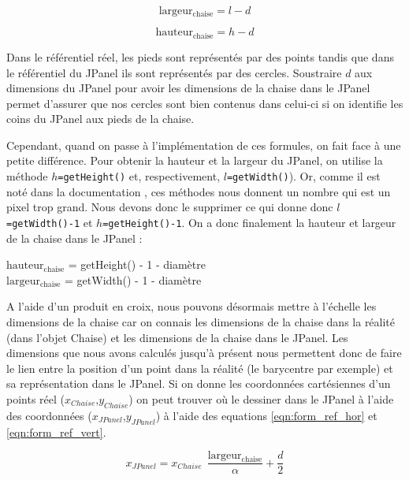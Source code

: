 \documentclass{polytech/polytech}
\begin{document}
\begin{equation}
\mathrm{largeur_{chaise}} = l - d
\end{equation}

\begin{equation}
\mathrm{hauteur_{chaise}} = h - d
\end{equation}

Dans le référentiel réel, les pieds sont représentés par des points tandis que dans le référentiel du JPanel ils sont représentés par des cercles. 
Soustraire $d$ aux dimensions du JPanel pour avoir les dimensions de la chaise dans le JPanel permet d'assurer que nos cercles sont bien contenus dans celui-ci si on identifie les coins du JPanel aux pieds de la chaise.

Cependant, quand on passe à l'implémentation de ces formules, on fait face à une petite différence. 
Pour obtenir la hauteur et la largeur du JPanel, on utilise la méthode \texttt{$h$=getHeight()} et, respectivement, \texttt{$l$=getWidth()}).
Or, comme il est noté dans la documentation \cite{ntu_swing}, ces méthodes nous donnent un nombre qui est un pixel trop grand. 
Nous devons donc le supprimer ce qui donne donc \texttt{$l$=getWidth()-1} et \texttt{$h$=getHeight()-1}.
On a donc finalement la hauteur et largeur de la chaise dans le JPanel :

\begin{center}
$\mathrm{hauteur_{chaise}}$  = getHeight() - 1 - diamètre\\
$\mathrm{largeur_{chaise}}$ = getWidth() - 1 - diamètre
\end{center}

A l'aide d'un produit en croix, nous pouvons désormais mettre à l'échelle les dimensions de la chaise car on connais les dimensions de la chaise dans la réalité (dans l'objet Chaise) et les dimensions de la chaise dans le JPanel.
Les dimensions que nous avons calculés jusqu'à présent nous permettent donc de faire le lien entre la position d'un point dans la réalité (le barycentre par exemple) et sa représentation dans le JPanel.
Si on donne les coordonnées cartésiennes d'un points réel ($x_{Chaise}$,$y_{Chaise}$) on peut trouver où le dessiner dans le JPanel à l'aide des coordonnées ($x_{JPanel}$,$y_{JPanel}$) à l'aide des equations \eqref{eqn:form_ref_hor} et \eqref{eqn:form_ref_vert}.

\begin{equation}
\label{eqn:form_ref_hor}
x_{JPanel} = x_{Chaise}\ \ \frac{\mathrm{largeur_{chaise}}}{\alpha} + \frac{d}{2}
\end{equation}
\end{document}
